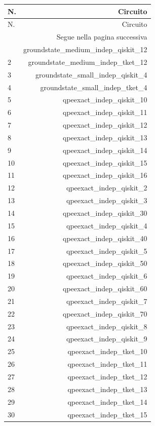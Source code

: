 \begin{longtable}{lr}
\toprule
N. & Circuito \\
\midrule
\endfirsthead
\toprule
N. & Circuito \\
\midrule\endhead
\midrule\multicolumn{2}{r}{\footnotesize Segue nella pagina successiva}\\
\endfoot
\bottomrule\endlastfoot
1 & groundstate\_medium\_indep\_qiskit\_12 \\
2 & groundstate\_medium\_indep\_tket\_12 \\
3 & groundstate\_small\_indep\_qiskit\_4 \\
4 & groundstate\_small\_indep\_tket\_4 \\
5 & qpeexact\_indep\_qiskit\_10 \\
6 & qpeexact\_indep\_qiskit\_11 \\
7 & qpeexact\_indep\_qiskit\_12 \\
8 & qpeexact\_indep\_qiskit\_13 \\
9 & qpeexact\_indep\_qiskit\_14 \\
10 & qpeexact\_indep\_qiskit\_15 \\
11 & qpeexact\_indep\_qiskit\_16 \\
12 & qpeexact\_indep\_qiskit\_2 \\
13 & qpeexact\_indep\_qiskit\_3 \\
14 & qpeexact\_indep\_qiskit\_30 \\
15 & qpeexact\_indep\_qiskit\_4 \\
16 & qpeexact\_indep\_qiskit\_40 \\
17 & qpeexact\_indep\_qiskit\_5 \\
18 & qpeexact\_indep\_qiskit\_50 \\
19 & qpeexact\_indep\_qiskit\_6 \\
20 & qpeexact\_indep\_qiskit\_60 \\
21 & qpeexact\_indep\_qiskit\_7 \\
22 & qpeexact\_indep\_qiskit\_70 \\
23 & qpeexact\_indep\_qiskit\_8 \\
24 & qpeexact\_indep\_qiskit\_9 \\
25 & qpeexact\_indep\_tket\_10 \\
26 & qpeexact\_indep\_tket\_11 \\
27 & qpeexact\_indep\_tket\_12 \\
28 & qpeexact\_indep\_tket\_13 \\
29 & qpeexact\_indep\_tket\_14 \\
30 & qpeexact\_indep\_tket\_15 \\

\end{longtable}
